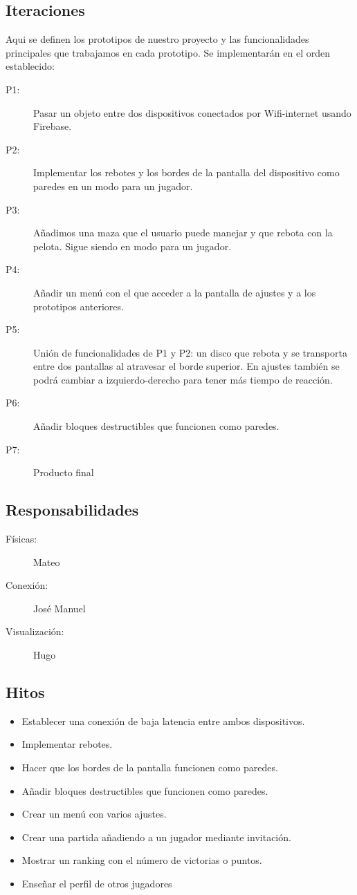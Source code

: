 \documentclass[a4paper,openright,12pt]{article}
\begin{document}
\subsection{Iteraciones}
Aqui se definen los prototipos de nuestro proyecto y las funcionalidades principales que trabajamos en cada prototipo. Se implementarán en el orden establecido:
\begin{description}
\item[P1:] Pasar un objeto entre dos dispositivos conectados por Wifi-internet usando Firebase.
\item[P2:] Implementar los rebotes y los bordes de la pantalla del dispositivo como paredes en un modo para un jugador.
\item[P3:] Añadimos una maza que el usuario puede manejar y que rebota con la pelota. Sigue siendo en modo para un jugador.
\item[P4:] Añadir un menú con el que acceder a la pantalla de ajustes y a los prototipos anteriores.
\item[P5:] Unión de funcionalidades de P1 y P2: un disco que rebota y se transporta entre dos pantallas al atravesar el borde superior. En ajustes también se podrá cambiar a izquierdo-derecho para tener más tiempo de reacción. 
\item[P6:] Añadir bloques destructibles que funcionen como paredes.
\item[P7:] Producto final
\end{description}
\subsection{Responsabilidades}
\begin{description}

\item[Físicas:] Mateo 
\item[Conexión:] José Manuel
\item[Visualización:] Hugo
\end{description}

\subsection{Hitos}
\begin{itemize}
\item Establecer una conexión de baja latencia entre ambos dispositivos.
\item Implementar rebotes.
\item Hacer que los bordes de la pantalla funcionen como paredes.
\item Añadir bloques destructibles que funcionen como paredes.
\item Crear un menú con varios ajustes.
\item Crear una partida añadiendo a un jugador mediante invitación.
\item Mostrar un ranking con el número de victorias o puntos.
\item Enseñar el perfil de otros jugadores
\end{itemize}
\end{document}
